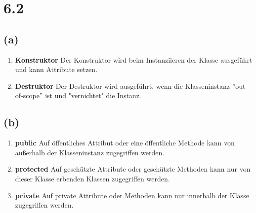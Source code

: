 \section*{6.2}
\subsection*{(a)}
\begin{enumerate}
\item \textbf{Konstruktor} Der Konstruktor wird beim Instanziieren der Klasse ausgeführt und kann Attribute setzen.
\item \textbf{Destruktor} Der Destruktor wird ausgeführt, wenn die Klasseninstanz ''out-of-scope'' ist und "vernichtet" die Instanz.
\end{enumerate}

\subsection*{(b)}
\begin{enumerate}
\item \textbf{public} Auf öffentliches Attribut oder eine öffentliche Methode kann von außerhalb der Klasseninstanz zugegriffen werden.
\item \textbf{protected} Auf geschützte Attribute oder geschützte Methoden kann nur von dieser Klasse erbenden Klassen zugegriffen werden.
\item \textbf{private} Auf private Attribute oder Methoden kann nur innerhalb der Klasse zugegriffen werden.
\end{enumerate}